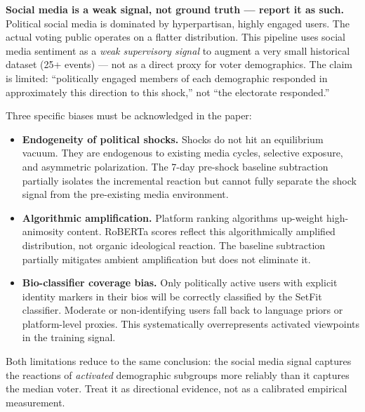 \documentclass[11pt]{article}
\begin{document}
\begin{mdframed}[style=warnbox]
\textbf{Social media is a weak signal, not ground truth --- report it as such.}
Political social media is dominated by hyperpartisan, highly engaged users.
The actual voting public operates on a flatter distribution. This pipeline uses
social media sentiment as a \emph{weak supervisory signal} to augment a very small
historical dataset (25+ events) --- not as a direct proxy for voter demographics.
The claim is limited: ``politically engaged members of each demographic responded
in approximately this direction to this shock,'' not ``the electorate responded.''

Three specific biases must be acknowledged in the paper:
\begin{itemize}[leftmargin=1.4em, itemsep=2pt]
  \item \textbf{Endogeneity of political shocks.} Shocks do not hit an equilibrium
        vacuum. They are endogenous to existing media cycles, selective exposure,
        and asymmetric polarization. The 7-day pre-shock baseline subtraction
        partially isolates the incremental reaction but cannot fully separate
        the shock signal from the pre-existing media environment.
  \item \textbf{Algorithmic amplification.} Platform ranking algorithms
        up-weight high-animosity content. RoBERTa scores reflect this
        algorithmically amplified distribution, not organic ideological reaction.
        The baseline subtraction partially mitigates ambient amplification
        but does not eliminate it.
  \item \textbf{Bio-classifier coverage bias.} Only politically active users
        with explicit identity markers in their bios will be correctly classified
        by the SetFit classifier. Moderate or non-identifying users fall back to
        language priors or platform-level proxies. This systematically overrepresents
        activated viewpoints in the training signal.
\end{itemize}
Both limitations reduce to the same conclusion: the social media signal captures
the reactions of \emph{activated} demographic subgroups more reliably than it
captures the median voter. Treat it as directional evidence, not as a calibrated
empirical measurement.
\end{mdframed}
\end{document}
